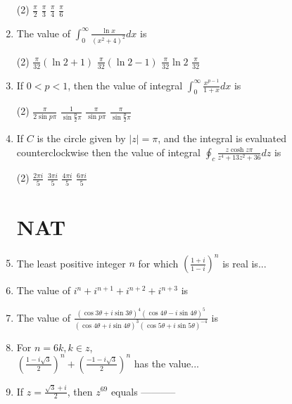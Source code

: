 \begin{enumerate}
	\begin{tasks}(2)
		\task[\textbf{a.}]$\frac{\pi}{2}$
		\task[\textbf{b.}]$\frac{\pi}{3}$
		\task[\textbf{c.}]$\frac{\pi}{4}$
		\task[\textbf{d.}] $\frac{\pi}{6}$
	\end{tasks}
	\item The value of $\int_{0}^{\infty} \frac{\ln x}{\left(x^{2}+4\right)^{2}} d x$ is
	\begin{tasks}(2)
		\task[\textbf{a.}]$\frac{\pi}{32}(\ln 2+1)$
		\task[\textbf{b.}] $\frac{\pi}{32}(\ln 2-1)$
		\task[\textbf{c.}]$\frac{\pi}{32} \ln 2$
		\task[\textbf{d.}]  $\frac{\pi}{32}$
	\end{tasks}
	\item If $0<p<1$, then the value of integral $\int_{0}^{\infty} \frac{x^{p-1}}{1+x} d x$ is
	\begin{tasks}(2)
		\task[\textbf{a.}]$\frac{\pi}{2 \sin p \pi}$
		\task[\textbf{b.}] $\frac{1}{\sin \frac{p}{2} \pi}$
		\task[\textbf{c.}]$\frac{\pi}{\sin p \pi}$
		\task[\textbf{d.}]  $\frac{\pi}{\sin \frac{p}{2} \pi}$
	\end{tasks}
	\item If $C$ is the circle given by $|z|=\pi$, and the integral is evaluated counterclockwise then the value of integral $\oint_{c} \frac{z \cosh z \pi}{z^{4}+13 z^{2}+36} d z$ is
	\begin{tasks}(2)
		\task[\textbf{a.}] $\frac{2 \pi i}{5}$
		\task[\textbf{b.}]$\frac{3 \pi i}{5}$
		\task[\textbf{c.}]$\frac{4 \pi i}{5}$
		\task[\textbf{d.}]  $\frac{6 \pi i}{5}$
	\end{tasks}
	\section{NAT}
	\item The least positive integer $n$ for which $\left(\frac{1+i}{1-i}\right)^{n}$ is real is...
	\item The value of $i^{n}+i^{n+1}+i^{n+2}+i^{n+3}$ is
	\item The value of $\frac{(\cos 3 \theta+i \sin 3 \theta)^{4}(\cos 4 \theta-i \sin 4 \theta)^{5}}{(\cos 4 \theta+i \sin 4 \theta)^{3}(\cos 5 \theta+i \sin 5 \theta)^{-4}}$ is
	\item For $n=6 k, k \in z$,\\
	$\left(\frac{1-i \sqrt{3}}{2}\right)^{n}+\left(\frac{-1-i \sqrt{3}}{2}\right)^{n}$ has the value...
	\item If $z=\frac{\sqrt{3}+i}{2}$, then $z^{69}$ equals -----------

\end{enumerate}
